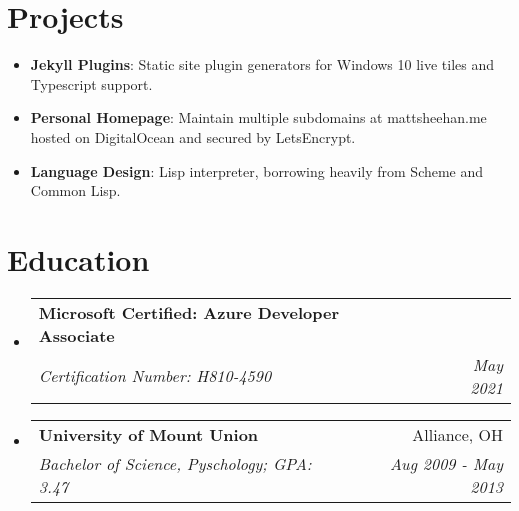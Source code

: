 \documentclass[letterpaper,11pt]{article}
\makeatletter
\newcommand{\resumeItem}[2]{
  \item\small{
    \textbf{#1}{: #2 \vspace{-2pt}}
  }
}
\newcommand{\resumeSubheading}[4]{
  \vspace{-1pt}\item
    \begin{tabular*}{0.97\textwidth}[t]{l@{\extracolsep{\fill}}r}
      \textbf{#1} & #2 \\
      \textit{\small#3} & \textit{\small #4} \\
    \end{tabular*}\vspace{-5pt}
}
\newcommand{\resumeSubItem}[2]{\resumeItem{#1}{#2}\vspace{-4pt}}
\newcommand{\resumeSubHeadingListStart}{\begin{itemize}[leftmargin=*]}
\newcommand{\resumeSubHeadingListEnd}{\end{itemize}}
\makeatother
\begin{document}
\section{Projects}
  \resumeSubHeadingListStart
    \resumeSubItem{Jekyll Plugins}
      {Static site plugin generators for Windows 10 live tiles and Typescript support.}
    \resumeSubItem{Personal Homepage}
      {Maintain multiple subdomains at mattsheehan.me hosted on DigitalOcean and secured by LetsEncrypt.}
    \resumeSubItem{Language Design}
      {Lisp interpreter, borrowing heavily from Scheme and Common Lisp.}
  \resumeSubHeadingListEnd


\section{Education}
  \resumeSubHeadingListStart
    \resumeSubheading
      {Microsoft Certified: Azure Developer Associate}{}
      {Certification Number: H810-4590}{May 2021}
    \resumeSubheading
      {University of Mount Union}{Alliance, OH}
      {Bachelor of Science, Pyschology;  GPA: 3.47}{Aug 2009 - May 2013}
  \resumeSubHeadingListEnd


%
%

\end{document}
